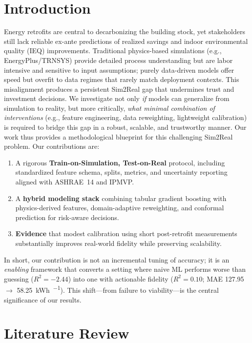 ﻿\documentclass{article}
\begin{document}
\section{Introduction}
Energy retrofits are central to decarbonizing the building stock, yet stakeholders still lack reliable ex-ante predictions of realized savings and indoor environmental quality (IEQ) improvements.
Traditional physics-based simulations (e.g., EnergyPlus/TRNSYS) provide detailed process understanding but are labor intensive and sensitive to input assumptions;
purely data-driven models offer speed but overfit to data regimes that rarely match deployment contexts.
This misalignment produces a persistent Sim2Real gap that undermines trust and investment decisions.
We investigate not only \emph{if} models can generalize from simulation to reality, but more critically, \emph{what minimal combination of interventions} (e.g., feature engineering, data reweighting, lightweight calibration) is required to bridge this gap in a robust, scalable, and trustworthy manner. Our work thus provides a methodological blueprint for this challenging Sim2Real problem.
Our contributions are:
\begin{enumerate}[leftmargin=8mm]
\item A rigorous \textbf{Train-on-Simulation, Test-on-Real} protocol, including standardized feature schema, splits, metrics, and uncertainty reporting aligned with ASHRAE~14 and IPMVP.
\item A \textbf{hybrid modeling stack} combining tabular gradient boosting with physics-derived features, domain-adaptive reweighting, and conformal prediction for risk-aware decisions.
\item \textbf{Evidence} that modest calibration using short post-retrofit measurements substantially improves real-world fidelity while preserving scalability.
\end{enumerate}

\noindent In short, our contribution is not an incremental tuning of accuracy; it is an \emph{enabling} framework that converts a setting where naive ML performs worse than guessing ($R^2=-2.44$) into one with actionable fidelity ($R^2=0.10$; MAE 127.95 $\rightarrow$ 58.25~\si{kWh\per\month}). This shift---from failure to viability---is the central significance of our results.

\section{Literature Review}
\end{document}

